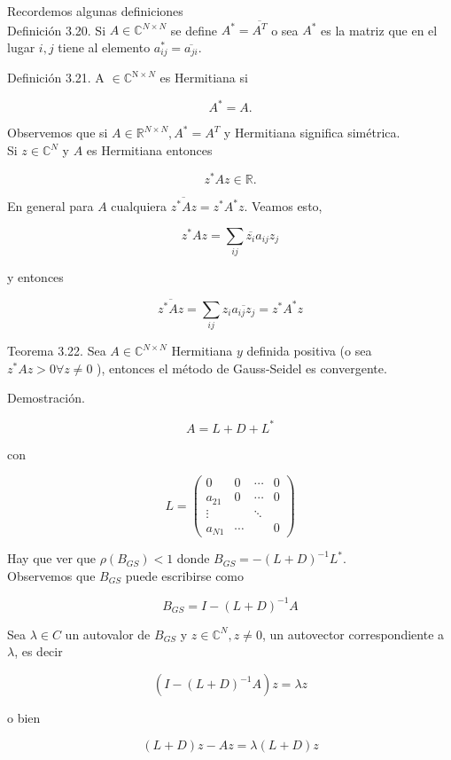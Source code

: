 \documentclass[10pt]{book}
\begin{document}
Recordemos algunas definiciones\\
Definición 3.20. Si $A \in \mathbb{C}^{N \times N}$ se define $A^{*}=\overline{A^{T}}$ o sea $A^{*}$ es la matriz que en el lugar $i, j$ tiene al elemento $a_{i j}^{*}=\overline{a_{j i}}$.

Definición 3.21. A $\in \mathbb{C}^{\mathrm{N} \times N}$ es Hermitiana si

$$
A^{*}=A .
$$

Observemos que si $A \in \mathbb{R}^{N \times N}, A^{*}=A^{T}$ y Hermitiana significa simétrica.\\
Si $z \in \mathbb{C}^{N}$ y $A$ es Hermitiana entonces

$$
z^{*} A z \in \mathbb{R} .
$$

En general para $A$ cualquiera $\overline{z^{*} A z}=z^{*} A^{*} z$. Veamos esto,

$$
z^{*} A z=\sum_{i j} \overline{z_{i}} a_{i j} z_{j}
$$

y entonces

$$
\overline{z^{*} A z}=\sum_{i j} z_{i} \overline{a_{i j} z_{j}}=z^{*} A^{*} z
$$

Teorema 3.22. Sea $A \in \mathbb{C}^{N \times N}$ Hermitiana $y$ definida positiva (o sea $z^{*} A z>0 \forall z \neq 0$ ), entonces el método de Gauss-Seidel es convergente.

Demostración.

$$
A=L+D+L^{*}
$$

con

$$
L=\left(\begin{array}{cccc}
0 & 0 & \cdots & 0 \\
a_{21} & 0 & \cdots & 0 \\
\vdots & & \ddots & \\
a_{N 1} & \cdots & & 0
\end{array}\right)
$$

Hay que ver que $\rho\left(B_{G S}\right)<1$ donde $B_{G S}=-(L+D)^{-1} L^{*}$.\\
Observemos que $B_{G S}$ puede escribirse como

$$
B_{G S}=I-(L+D)^{-1} A
$$

Sea $\lambda \in C$ un autovalor de $B_{G S}$ y $z \in \mathbb{C}^{N}, z \neq 0$, un autovector correspondiente a $\lambda$, es decir

$$
\left(I-(L+D)^{-1} A\right) z=\lambda z
$$

o bien

$$
(L+D) z-A z=\lambda(L+D) z
$$
\end{document}
